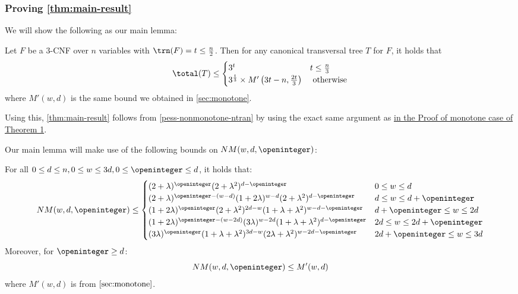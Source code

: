 \subsubsection{Proving \cref{thm:main-result}}

We will show the following as our main lemma:

\begin{lemma}
\label{pess-nonmonotone-ntran}
Let $F$ be a $3$-CNF over $n$ variables with $\trn(F) = t \le \frac{n}{2}$. Then for any canonical transversal tree $T$ for $F$, it holds that 
\[
\total(T) \le
\begin{cases}
3^t & t \le \frac{n}{3}\\
3^{\frac{t}{3}}\times M'\left(3t - n, \frac{2t}{3}\right) & \textrm{ otherwise}
\end{cases}
\]
where $M'(w, d)$ is the same bound we obtained in \cref{sec:monotone}.
\end{lemma}


Using this, \cref{thm:main-result} follows from \cref{pess-nonmonotone-ntran} by using the exact same argument as \hyperref[proof:monotone-main-result]{in the Proof of monotone case of Theorem 1}.


Our main lemma will make use of the following bounds on $NM(w, d, \openinteger)$:

\begin{lemma} 
\label{lem:NMwdo}
For all $0\le d\le n, 0\le w\le 3d, 0\le \openinteger\le d$, it holds that:
\[
NM(w,d,\openinteger) \le
\begin{cases}
(2+\lambda)^{\openinteger}(2+\lambda^2)^{d-\openinteger}
 & 0\le w \le d\\
(2+\lambda)^{\openinteger - (w-d)}(1+2\lambda)^{w-d}(2+\lambda^2)^{d-\openinteger}
 & d\le w \le d + \openinteger\\
(1+2\lambda)^{\openinteger}(2+\lambda^2)^{2d-w}(1+\lambda+\lambda^2)^{w-d-\openinteger}
& d+\openinteger\le w\le 2d\\
(1+2\lambda)^{\openinteger - (w-2d)}(3\lambda)^{w-2d}(1+\lambda+\lambda^2)^{d-\openinteger}
& 2d\le w\le 2d+\openinteger\\
(3\lambda)^{\openinteger}(1+\lambda+\lambda^2)^{3d-w}(2\lambda + \lambda^2)^{w-2d-\openinteger}
& 2d+\openinteger\le w\le 3d\\
\end{cases}
\]
Moreover, for $\openinteger \ge d$:
\[
   NM(w, d, \openinteger) \le M'(w, d)
\]
where $M'(w, d)$ is from $\cref{sec:monotone}$.
\end{lemma}


